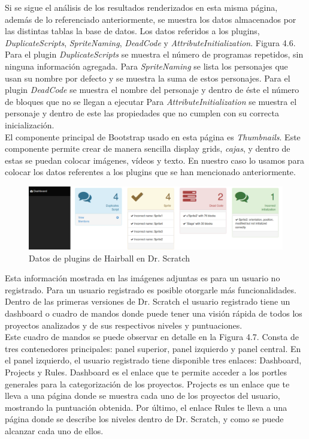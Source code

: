 \documentclass[a4paper, 12pt]{book}
\begin{document}
Si se sigue el análisis de los resultados renderizados en esta misma página, además de 
lo referenciado anteriormente, se muestra los datos almacenados por las distintas tablas
la base de datos.  Los datos referidos a los plugins, \emph{DuplicateScripts}, 
\emph{SpriteNaming}, \emph{DeadCode} y \emph{AttributeInitialization}. Figura 4.6. \\

Para el plugin \emph{DuplicateScripts} se muestra el número de programas repetidos, sin 
ninguna información agregada. Para \emph{SpriteNaming} se lista los personajes que usan
su nombre por defecto y se muestra la suma de estos personajes. 
Para el plugin \emph{DeadCode} se muestra el nombre del personaje y dentro de éste el 
número de bloques que no se llegan a ejecutar
Para \emph{AttributeInitialization} se muestra el personaje y dentro de este las 
propiedades que no cumplen con su correcta inicialización. \\

El componente principal de Bootstrap usado en esta página es \emph{Thumbnails}. Este
componente permite crear de manera sencilla display grids, \emph{cajas}, y dentro de
estas se puedan colocar imágenes, vídeos y texto. En nuestro caso lo usamos para
colocar los datos referentes a los plugins que se han mencionado anteriormente. \\ 

 \begin{figure}
		\graphicspath{{img/}}
    \includegraphics[bb=0 0 800 600, width=12cm, keepaspectratio]{plugins.png}
		\caption{Datos de plugins de Hairball en Dr. Scratch}
    \label{figura:foro_hilos}
 \end{figure} 

Esta información mostrada en las imágenes adjuntas es para un usuario no registrado.
Para un usuario registrado es posible otorgarle más funcionalidades. Dentro de las
primeras versiones de Dr. Scratch el usuario registrado tiene un dashboard o cuadro
de mandos donde puede tener una visión rápida de todos los proyectos analizados y de
sus respectivos niveles y puntuaciones. \\

Este cuadro de mandos se puede observar en detalle en la Figura 4.7. Consta de tres 
contenedores principales: panel superior, panel izquierdo y panel central.
En el panel izquierdo, el usuario registrado tiene disponible tres enlaces: Dashboard,
Projects y Rules. Dashboard es el enlace que te permite acceder a los portles generales
para la categorización de los proyectos. Projects es un enlace que te lleva a una 
página donde se muestra cada uno de los proyectos del usuario, mostrando la puntuación
obtenida. Por último, el enlace Rules te lleva a una página donde se describe los niveles
dentro de Dr. Scratch, y como se puede alcanzar cada uno de ellos. \\
\end{document}
